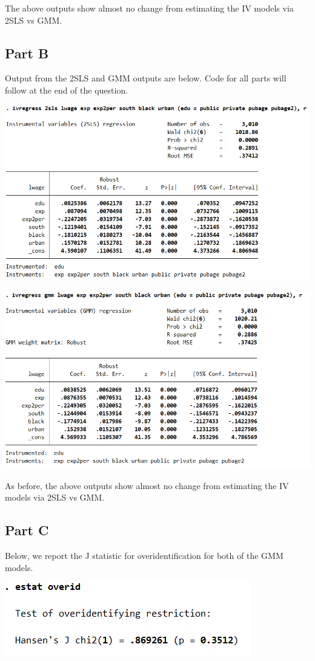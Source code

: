 \documentclass[11pt]{article} %
\begin{document}
The above outputs show almost no change from estimating the IV models via 2SLS vs GMM.

\subsection{Part B}
Output from the 2SLS and GMM outputs are below. Code for all parts will follow at the end of the question. 

\includegraphics{p3}

\includegraphics{p4}

As before, the above outputs show almost no change from estimating the IV models via 2SLS vs GMM.

\subsection{Part C}
Below, we report the J statistic for overidentification for both of the GMM models.

\includegraphics{p5}
\end{document}
